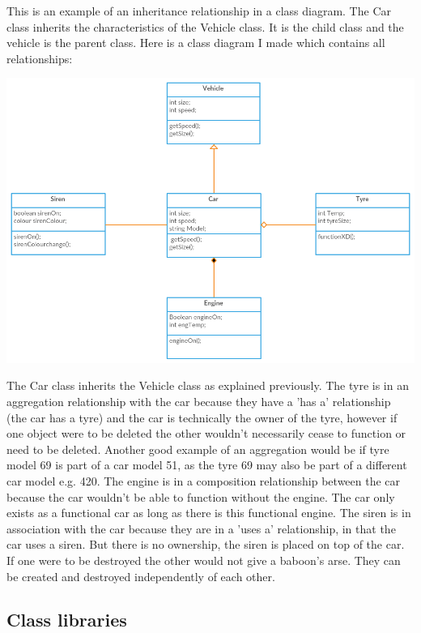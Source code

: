 \documentclass{article}
\begin{document}
This is an example of an inheritance relationship in a class diagram. The Car class inherits the
characteristics of the Vehicle class. It is the child class and the vehicle is the parent class.
Here is a class diagram I made which contains all relationships:
\begin{center}
\includegraphics[scale=0.5]{myclassdiagram.png}
\end{center}

The Car class inherits the Vehicle class as explained previously. The tyre is in an aggregation relationship
with the car because they have a 'has a' relationship (the car has a tyre) and the car is technically the 
owner of the tyre, however if one object were to be deleted the other wouldn't necessarily cease
to function or need to be deleted. Another good example of an aggregation would be if tyre model 69
is part of a car model 51, as the tyre 69 may also be part of a different car model e.g. 420. The engine
is in a composition relationship between the car because the car wouldn't be able to function without the
engine. The car only exists as a functional car as long as there is this functional engine. The siren is
in association with the car because they are in a 'uses a' relationship, in that the car uses a siren.
But there is no ownership, the siren is placed on top of the car. If one were to be destroyed the other
would not give a baboon's arse. They can be created and destroyed independently of each other.

\subsection{Class libraries}
\end{document}
